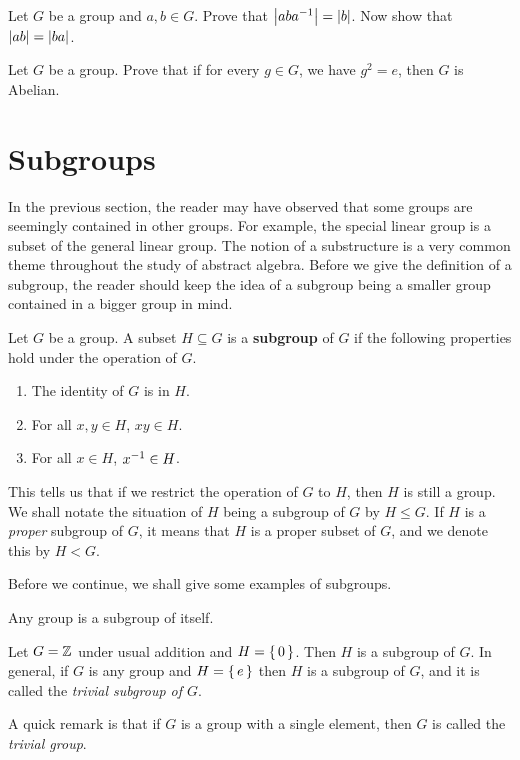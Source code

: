 \documentclass[./algebra-notes.tex]{subfiles}
\begin{document}
\begin{prob}
    Let $G$ be a group and $a, b \in G$. Prove that $\abs{aba\inv} = \abs{b}$.
    Now show that $\abs{ab} = \abs{ba}$. 
\end{prob}

\begin{prob}
    Let $G$ be a group. Prove that if for every $g \in G$, we have $g^2 = e$,
    then $G$ is Abelian.
\end{prob}


\pagebreak
\section{Subgroups}
In the previous section, the reader may have observed that some groups are
seemingly contained in other groups. For example, the special linear group is a
subset of the general linear group. The notion of a substructure is a very
common theme throughout the study of abstract algebra. Before we give the
definition of a subgroup, the reader should keep the idea of a subgroup being a
smaller group contained in a bigger group in mind.

\begin{definition}[Subgroup]
\label{def:subgroup}
    Let $G$ be a group. A subset $H \subseteq G$ is a \textbf{subgroup} of $G$
    if the following properties hold under the operation of $G$.
    \begin{enumerate}
        \item The identity of $G$ is in $H$.
        \item For all $x, y \in H$, $xy \in H$.
        \item For all $x \in H$, $x ^{-1} \in H$.
    \end{enumerate}
\end{definition}
This tells us that if we restrict the operation of $G$ to $H$, then $H$ is still
a group. We shall notate the situation of $H$ being a subgroup of $G$ by $H \leq
G$. If $H$ is a \emph{proper} subgroup of $G$, it means that $H$ is a proper
subset of $G$, and we denote this by $H < G$.

Before we continue, we shall give some examples of subgroups.

\begin{example}
    Any group is a subgroup of itself.
\end{example}

\begin{example}
    Let $G = \mathbb{Z}$ under usual addition and $H = \set{0}$. Then $H$ is a subgroup of
    $G$. In general, if $G$ is any group and $H = \set{e}$ then $H$ is a
    subgroup of $G$, and it is called the \emph{trivial subgroup of $G$}. 
\end{example}
A quick remark is that if $G$ is a group with a single element, then $G$ is
called the \emph{trivial group}.
\end{document}
